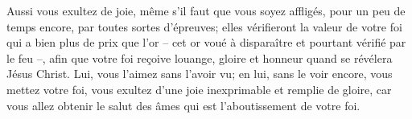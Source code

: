 Aussi vous exultez de joie,
	même s’il faut que vous soyez affligés, pour un peu de temps encore,
	par toutes sortes d’épreuves;
	elles vérifieront la valeur de votre foi qui a bien plus de prix que l’or
	– cet or voué à disparaître et pourtant vérifié par le feu –,
	afin que votre foi reçoive louange, gloire et honneur
	quand se révélera Jésus Christ.
Lui, vous l’aimez sans l’avoir vu;
	en lui, sans le voir encore, vous mettez votre foi,
	vous exultez d’une joie inexprimable et remplie de gloire,
	car vous allez obtenir le salut des âmes
	qui est l’aboutissement de votre foi.
